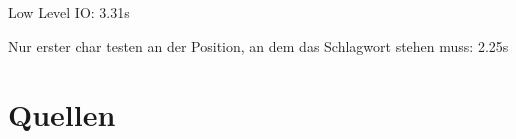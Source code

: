 \documentclass[ngerman, a4paper, footsepline, headsepline]{scrreport}
\begin{document}
	Low Level IO: 3.31s
	
	Nur erster char testen an der Position, an dem das Schlagwort stehen muss: 2.25s 
	
	
	\chapter{Quellen}
	
	
	
	
	
	
\end{document}
